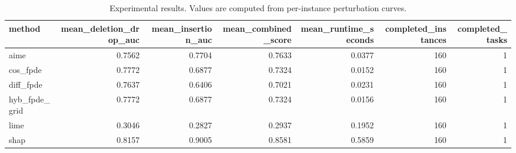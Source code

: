 \begin{table}[t]
\caption{Experimental results. Values are computed from per-instance perturbation curves.}
\label{tab:main_results_computed}
\centering
\begin{tabular}{lrrrrrr}
\toprule
method & mean\_deletion\_drop\_auc & mean\_insertion\_auc & mean\_combined\_score & mean\_runtime\_seconds & completed\_instances & completed\_tasks \\
\midrule
aime & 0.7562 & 0.7704 & 0.7633 & 0.0377 & 160 & 1 \\
cos\_fpde & 0.7772 & 0.6877 & 0.7324 & 0.0152 & 160 & 1 \\
diff\_fpde & 0.7637 & 0.6406 & 0.7021 & 0.0231 & 160 & 1 \\
hyb\_fpde\_grid & 0.7772 & 0.6877 & 0.7324 & 0.0156 & 160 & 1 \\
lime & 0.3046 & 0.2827 & 0.2937 & 0.1952 & 160 & 1 \\
shap & 0.8157 & 0.9005 & 0.8581 & 0.5859 & 160 & 1 \\
\bottomrule
\end{tabular}

\end{table}
